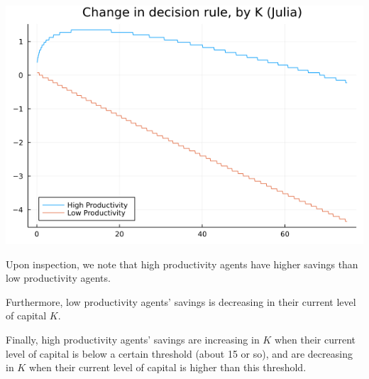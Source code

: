 \documentclass[12pt]{article}
\begin{document}
\begin{enumerate}
    \begin{center}
        \includegraphics[scale=0.4]{netpfplot.png}
    \end{center}
    Upon inspection, we note that high productivity agents have higher savings than low productivity agents.
    
    Furthermore, low productivity agents' savings is decreasing in their current level of capital $K$.

    Finally, high productivity agents' savings are increasing in $K$ when their current level of capital is below a certain threshold (about 15 or so), and are decreasing in $K$ when their current level of capital is higher than this threshold. 

	\end{enumerate}
    
\end{document}
